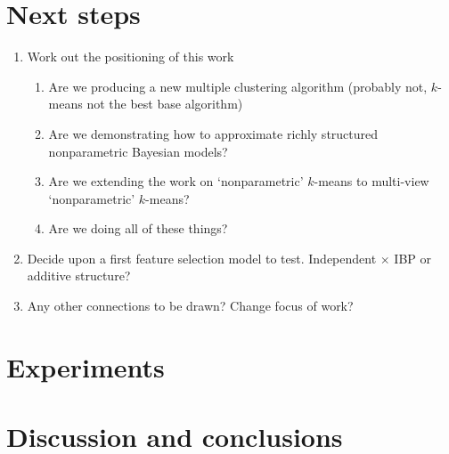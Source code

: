 \documentclass{article}
\numberwithin{equation}{section}
\numberwithin{thm}{section}
\begin{document}
\section{Next steps}

\begin{enumerate}
\item Work out the positioning of this work
\begin{enumerate}
\item Are we producing a new multiple clustering algorithm (probably not, $k$-means not the best base algorithm)
\item Are we demonstrating how to approximate richly structured nonparametric Bayesian models?
\item Are we extending the work on `nonparametric' $k$-means to multi-view `nonparametric' $k$-means?
\item Are we doing all of these things?
\end{enumerate}
\item Decide upon a first feature selection model to test. Independent $\times$ IBP or additive structure?
\item Any other connections to be drawn? Change focus of work?
\end{enumerate}

\section{Experiments}

\section{Discussion and conclusions}


\small{

%

}
\end{document}
